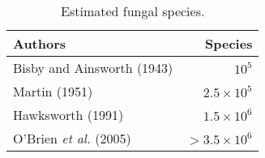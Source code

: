 \documentclass[twoside,12pt,english]{book}
\begin{document}
\begin{wraptable}{r}{7 cm}
	\vspace{-.5cm}
	\centering
	\footnotesize
	\caption{\label{wraptab}Estimated fungal species.}
	\begin{tabular}{lr}                                            \\\toprule
		Authors                      & Species          \\\midrule
		Bisby and Ainsworth (1943)   & $10^5$           \\
		Martin (1951)                & $2.5\times10^5$  \\
		Hawksworth (1991)            & $1.5\times10^6$  \\
		O’Brien \emph{et al.} (2005) & $>3.5\times10^6$ \\  \bottomrule
	\end{tabular}
\end{wraptable}


\lipsum[4-6]
\end{document}
